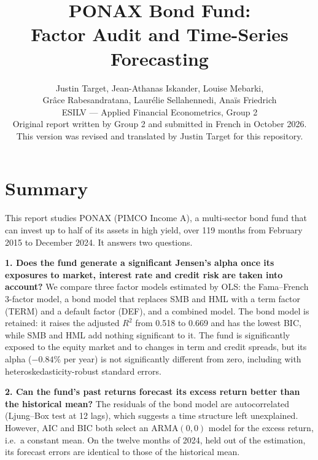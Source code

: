 \documentclass[11pt,a4paper]{article}
\title{PONAX Bond Fund:\\ Factor Audit and Time-Series Forecasting}
\author{Justin Target, Jean-Athanas Iskander, Louise Mebarki,\\
Grâce Rabesandratana, Laurélie Sellahennedi, Anaïs Friedrich\\[0.6em]
\small ESILV --- Applied Financial Econometrics, Group 2\\[0.6em]
\footnotesize Original report written by Group 2 and submitted in French in October 2026.\\
\footnotesize This version was revised and translated by Justin Target for this repository.}
\date{}
\begin{document}
\maketitle

\section*{Summary}

This report studies PONAX (PIMCO Income A), a multi-sector bond fund that can invest up to half of its assets in high yield, over 119 months from February 2015 to December 2024. It answers two questions.

\textbf{1. Does the fund generate a significant Jensen's alpha once its exposures to market, interest rate and credit risk are taken into account?} We compare three factor models estimated by OLS: the Fama--French 3-factor model, a bond model that replaces SMB and HML with a term factor (TERM) and a default factor (DEF), and a combined model. The bond model is retained: it raises the adjusted $R^2$ from 0.518 to 0.669 and has the lowest BIC, while SMB and HML add nothing significant to it. The fund is significantly exposed to the equity market and to changes in term and credit spreads, but its alpha ($-0.84\%$ per year) is not significantly different from zero, including with heteroskedasticity-robust standard errors.

\textbf{2. Can the fund's past returns forecast its excess return better than the historical mean?} The residuals of the bond model are autocorrelated (Ljung--Box test at 12 lags), which suggests a time structure left unexplained. However, AIC and BIC both select an ARMA$(0,0)$ model for the excess return, i.e.\ a constant mean. On the twelve months of 2024, held out of the estimation, its forecast errors are identical to those of the historical mean.
\end{document}
